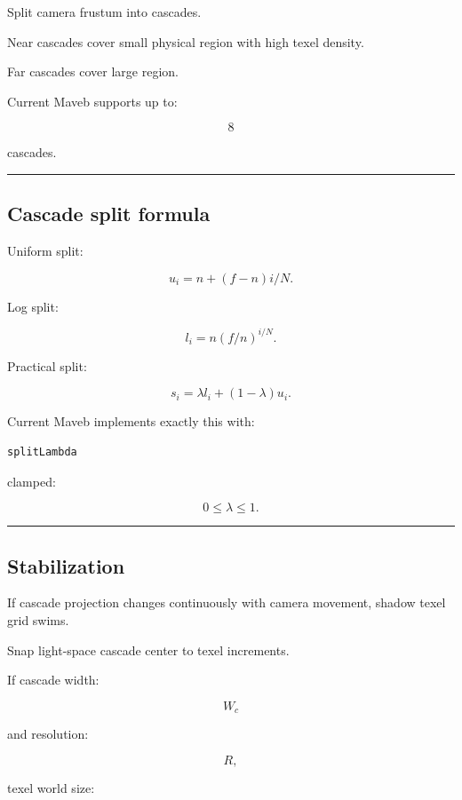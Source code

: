 Split camera frustum into cascades.

Near cascades cover small physical region with high texel density.

Far cascades cover large region.

Current Maveb supports up to:

\[
8
\]

cascades.

\begin{center}\rule{0.5\linewidth}{0.5pt}\end{center}

\subsection{Cascade split formula}\label{04-visual-computing-ii-ch040-cascade-split-formula}

Uniform split:

\[
u_i=
n+(f-n)i/N.
\]

Log split:

\[
l_i=
n(f/n)^{i/N}.
\]

Practical split:

\[
\boxed{
s_i=
\lambda l_i+
(1-\lambda)u_i.
}
\]

Current Maveb implements exactly this with:

\begin{verbatim}
splitLambda
\end{verbatim}

clamped:

\[
0\le\lambda\le1.
\]

\begin{center}\rule{0.5\linewidth}{0.5pt}\end{center}

\subsection{Stabilization}\label{04-visual-computing-ii-ch040-stabilization}

If cascade projection changes continuously with camera movement, shadow texel grid swims.

Snap light-space cascade center to texel increments.

If cascade width:

\[
W_c
\]

and resolution:

\[
R,
\]

texel world size:

